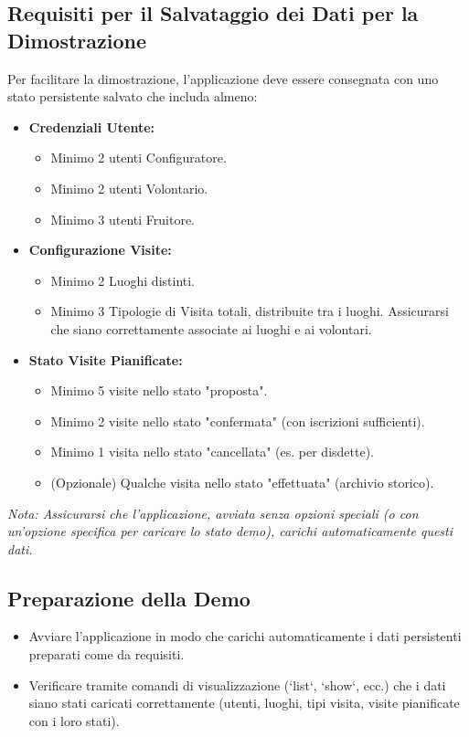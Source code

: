 \documentclass[a4paper,12pt]{article}
\begin{document}
    \subsection{Requisiti per il Salvataggio dei Dati per la Dimostrazione}
    Per facilitare la dimostrazione, l'applicazione deve essere consegnata con uno stato persistente salvato che includa almeno:
    \begin{itemize}
        \item \textbf{Credenziali Utente:}
        \begin{itemize}
            \item Minimo 2 utenti Configuratore.
            \item Minimo 2 utenti Volontario.
            \item Minimo 3 utenti Fruitore.
        \end{itemize}
        \item \textbf{Configurazione Visite:}
        \begin{itemize}
            \item Minimo 2 Luoghi distinti.
            \item Minimo 3 Tipologie di Visita totali, distribuite tra i luoghi. Assicurarsi che siano correttamente associate ai luoghi e ai volontari.
        \end{itemize}
        \item \textbf{Stato Visite Pianificate:}
        \begin{itemize}
            \item Minimo 5 visite nello stato "proposta".
            \item Minimo 2 visite nello stato "confermata" (con iscrizioni sufficienti).
            \item Minimo 1 visita nello stato "cancellata" (es. per disdette).
            \item (Opzionale) Qualche visita nello stato "effettuata" (archivio storico).
        \end{itemize}
    \end{itemize}
    \textit{Nota: Assicurarsi che l'applicazione, avviata senza opzioni speciali (o con un'opzione specifica per caricare lo stato demo), carichi automaticamente questi dati.}

    \subsection{Preparazione della Demo}
    \begin{itemize}
        \item Avviare l'applicazione in modo che carichi automaticamente i dati persistenti preparati come da requisiti.
        \item Verificare tramite comandi di visualizzazione (`list`, `show`, ecc.) che i dati siano stati caricati correttamente (utenti, luoghi, tipi visita, visite pianificate con i loro stati).
    \end{itemize}
\end{document}
